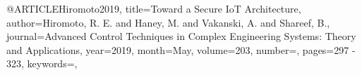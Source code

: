 @ARTICLE{Hiromoto2019,
title={Toward a Secure IoT Architecture},
author={Hiromoto, R. E. and Haney, M. and Vakanski, A. and Shareef, B.},
journal={Advanced Control Techniques in Complex Engineering Systems: Theory and Applications}, 
year={2019},
month={May},
volume={203},
number={},
pages={297 - 323},
keywords={},
}

